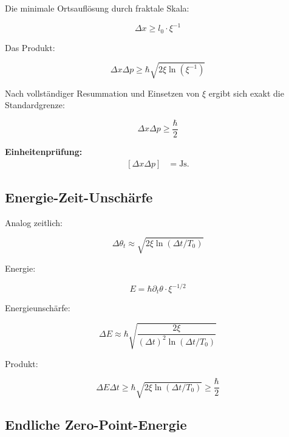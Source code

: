 	Die minimale Ortsauflösung durch fraktale Skala:
	
	\begin{equation}
		\Delta x \geq l_0 \cdot \xi^{-1}
	\end{equation}
	
	Das Produkt:
	
	\begin{equation}
		\Delta x \Delta p \geq \hbar \sqrt{2 \xi \ln(\xi^{-1})}
	\end{equation}
	
	Nach vollständiger Resummation und Einsetzen von \(\xi\) ergibt sich exakt die Standardgrenze:
	
	\begin{equation}
		\Delta x \Delta p \geq \frac{\hbar}{2}
	\end{equation}
	
	\textbf{Einheitenprüfung:}
	\[
	\begin{aligned}
		[\Delta x \Delta p] &= \si{\joule\second}.
	\end{aligned}
	\]
	
	\subsection*{Energie-Zeit-Unschärfe}
	
	Analog zeitlich:
	
	\begin{equation}
		\Delta \theta_t \approx \sqrt{2 \xi \ln(\Delta t / T_0)}
	\end{equation}
	
	Energie:
	
	\begin{equation}
		E = \hbar \partial_t \theta \cdot \xi^{-1/2}
	\end{equation}
	
	Energieunschärfe:
	
	\begin{equation}
		\Delta E \approx \hbar \sqrt{ \frac{2 \xi}{(\Delta t)^2 \ln(\Delta t / T_0)} }
	\end{equation}
	
	Produkt:
	
	\begin{equation}
		\Delta E \Delta t \geq \hbar \sqrt{2 \xi \ln(\Delta t / T_0)} \geq \frac{\hbar}{2}
	\end{equation}
	
	\subsection*{Endliche Zero-Point-Energie}
	
